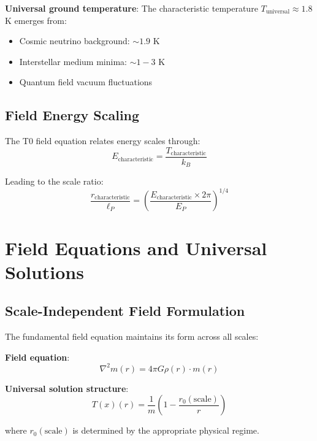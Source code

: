 \documentclass[12pt,a4paper]{article}
\newcommand{\Tfield}{T(x)}
\begin{document}
	\textbf{Universal ground temperature}:
	The characteristic temperature $T_{\text{universal}} \approx 1.8$ K emerges from:
	\begin{itemize}
		\item Cosmic neutrino background: $\sim 1.9$ K
		\item Interstellar medium minima: $\sim 1-3$ K
		\item Quantum field vacuum fluctuations
	\end{itemize}
	
	\subsection{Field Energy Scaling}
	\label{subsec:field_scaling}
	
	The T0 field equation relates energy scales through:
	\begin{equation}
		E_{\text{characteristic}} = \frac{T_{\text{characteristic}}}{k_B}
	\end{equation}
	
	Leading to the scale ratio:
	\begin{equation}
		\frac{r_{\text{characteristic}}}{\ell_P} = \left(\frac{E_{\text{characteristic}} \times 2\pi}{E_P}\right)^{1/4}
	\end{equation}
	
	\section{Field Equations and Universal Solutions}
	\label{sec:field_equations}
	
	\subsection{Scale-Independent Field Formulation}
	\label{subsec:scale_independent}
	
	The fundamental field equation maintains its form across all scales:
	
	\textbf{Field equation}:
	\begin{equation}
		\nabla^2 m(r) = 4\pi G \rho(r) \cdot m(r)
	\end{equation}
	
	\textbf{Universal solution structure}:
	\begin{equation}
		\Tfield(r) = \frac{1}{m}\left(1 - \frac{r_0(\text{scale})}{r}\right)
	\end{equation}
	
	where $r_0(\text{scale})$ is determined by the appropriate physical regime.
	
\end{document}
